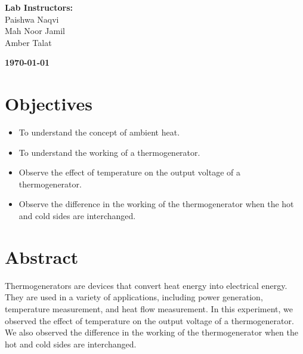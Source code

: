 \documentclass[a4paper, 12pt, english]{article}
\begin{document}
\begin{titlepage}
\begin{center}
		\vspace{45pt}
		\textbf {\large Lab Instructors:}\\[0.2cm]
		\Large {Paishwa Naqvi}\\[0.1cm]
		\Large {Mah Noor Jamil}\\[0.1cm]
		\Large {Amber Talat}\\[0.1cm]
	\end{center}

	\par
	\vfill
	\begin{center}
		\textbf{\today}\\
	\end{center}

\end{titlepage}



\newpage
\section{Objectives}
\begin{itemize}
	\item To understand the concept of ambient heat.
	\item To understand the working of a thermogenerator.
	\item Observe the effect of temperature on the output voltage of a thermogenerator.
	\item Observe the difference in the working of the thermogenerator when the hot and
	      cold sides are interchanged.
\end{itemize}

\section{Abstract}
Thermogenerators are devices that convert heat energy into electrical energy.
They are used in a variety of applications, including power generation,
temperature measurement, and heat flow measurement. In this experiment, we
observed the effect of temperature on the output voltage of a thermogenerator.
We also observed the difference in the working of the thermogenerator when the
hot and cold sides are interchanged.
\end{document}
